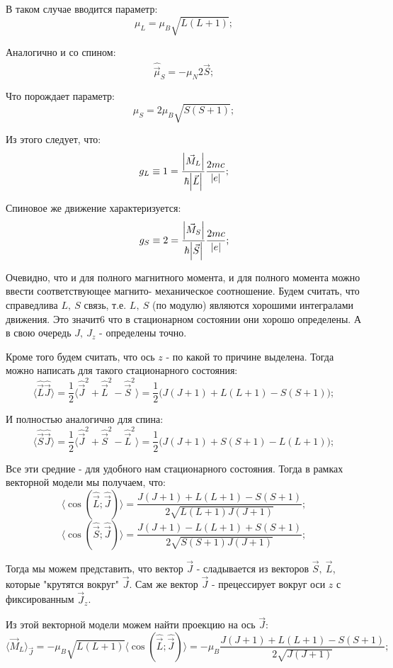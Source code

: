 \documentclass[a4paper, 14pt, russian]{article}
\newcommand{\be}{\begin{equation}}
\newcommand{\ee}{\end{equation}}
\begin{document}
	В таком случае вводится параметр:
	\be
		\mu_L = \mu_B \sqrt{L(L+1)};
	\ee

	Аналогично и со спином:
	\be
		\hat{\vec \mu}_S = - \mu_N 2 \hat{\vec S};
	\ee

	Что порождает параметр:
	\be
		\mu_S = 2 \mu_B \sqrt{S(S+1)};
	\ee

	Из этого следует, что:
	\be
		g_L \equiv 1 = \frac{\abs{\vec{M}_L}}{\hbar \abs{\vec L}} \frac{2mc}{\abs{e}};
	\ee

	Спиновое же движение характеризуется:
	\be
		g_S \equiv 2 = \frac{\abs{\vec{M}_S}}{\hbar \abs{\vec S}} \frac{2mc}{\abs{e}};
	\ee


	Очевидно, что и для полного магнитного момента,
	и для полного момента можно ввести соответствующее магнито-
	механическое соотношение. Будем считать, что справедлива
	$L,~S$ связь, т.е. $L,~S$ (по модулю) являются хорошими 
	интегралами движения. Это значит6 что в стационарном состоянии
	они хорошо определены. А в свою очередь $J,~J_z$ - 
	определены точно.

	Кроме того будем считать, что ось $z$ - по какой то причине выделена.
	Тогда можно написать для такого стационарного состояния:
	\be
		\langle \hat{\vec L} \hat{\vec J} \rangle = \frac{1}{2} \langle \hat{\vec J}^2 + 
			\hat{\vec L}^2 - \hat{\vec S}^2\rangle = \frac{1}{2} \big( J (J +1 ) +L (L + 1) 
			- S(S + 1)\big);
	\ee

	И полностью аналогично для спина:
	\be
		\langle \hat{\vec S} \hat{\vec J} \rangle = \frac{1}{2} \langle \hat{\vec J}^2 + 
			\hat{\vec S}^2 - \hat{\vec L}^2\rangle = \frac{1}{2} \big( J (J +1 ) +S (S + 1) 
			- L(L + 1)\big);
	\ee

	Все эти средние  - для удобного нам стационарного состояния. Тогда в рамках
	векторной модели мы получаем, что:
	\be
		\langle \cos{(\hat{\vec L};\hat{\vec J})} \rangle = \frac{J(J+1) + L(L+1)-S(S+1)}
			{2\sqrt{L(L+1)J(J+1)}};
	\ee
	\be
		\langle \cos{(\hat{\vec S};\hat{\vec J})} \rangle = \frac{J(J+1) - L(L+1)+S(S+1)}
			{2\sqrt{S(S+1)J(J+1)}};
	\ee

	Тогда мы можем представить, что вектор $\vec J$ - сладывается
	из векторов $\vec S,~\vec L$, которые "крутятся вокруг" $\vec J$.
	Сам же вектор $\vec J$ - прецессирует вокруг оси $z$ с фиксированным 
	$\vec{J}_z$.

	Из этой векторной модели можем найти проекцию на ось $\vec J$:
	\be
		\langle \vec{M}_L \rangle_{\vec J} = - \mu_B \sqrt{L(L+1)}
			\langle \cos(\hat{\vec L};\hat{\vec J})\rangle = 
			- \mu_B \frac{J(J+1) + L(L+1) - S(S+1)}{2\sqrt{J(J+1)}};
	\ee
\end{document}
